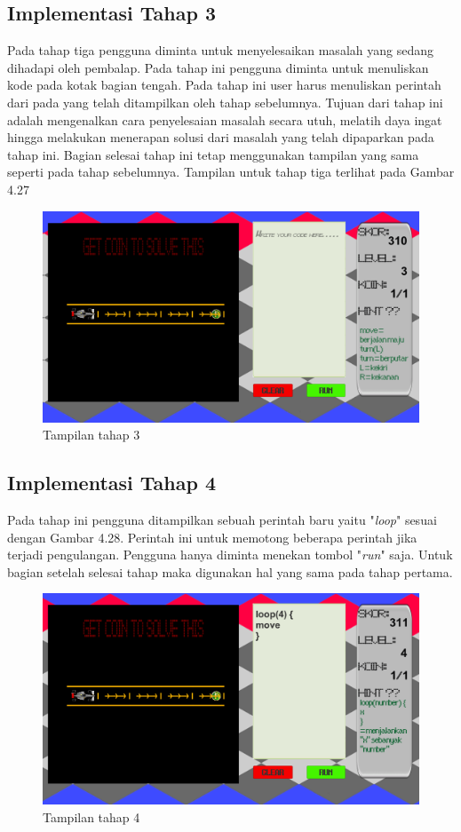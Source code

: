 	\subsection{Implementasi Tahap 3}
	Pada tahap tiga pengguna diminta untuk menyelesaikan masalah yang sedang dihadapi oleh pembalap. Pada tahap ini pengguna diminta untuk menuliskan kode pada kotak bagian tengah. Pada tahap ini user harus menuliskan perintah dari pada yang telah ditampilkan oleh tahap sebelumnya. Tujuan dari tahap ini adalah mengenalkan cara penyelesaian masalah secara utuh, melatih daya ingat hingga melakukan menerapan solusi dari masalah yang telah dipaparkan pada tahap ini. Bagian selesai tahap ini tetap menggunakan tampilan yang sama seperti pada tahap sebelumnya. Tampilan untuk tahap tiga terlihat pada Gambar 4.27
	\begin{figure}
		\centering
		\includegraphics[width=\linewidth-40pt]{pics/prototipe/tahap3}
		\caption{Tampilan tahap 3}
	\end{figure}
	\subsection{Implementasi Tahap 4}
	Pada tahap ini pengguna ditampilkan sebuah perintah baru yaitu "\textit{loop}" sesuai dengan Gambar 4.28. Perintah ini untuk memotong beberapa perintah jika terjadi pengulangan. Pengguna hanya diminta menekan tombol "\textit{run}" saja. Untuk bagian setelah selesai tahap maka digunakan hal yang sama pada tahap pertama.
	\begin{figure}
		\centering
		\includegraphics[width=\linewidth-40pt]{pics/prototipe/tahap4}
		\caption{Tampilan tahap 4}
	\end{figure}

